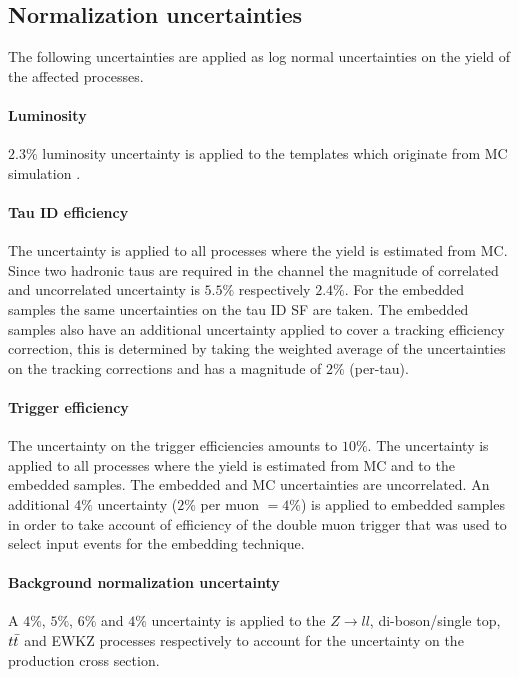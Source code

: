 \subsection{Normalization uncertainties}
The following uncertainties are applied as log normal uncertainties on the yield of the affected
processes.

\paragraph{Luminosity} $2.3 \%$ luminosity uncertainty is applied to the templates which originate from MC simulation \cite{CMS:2018elu}.

\paragraph{Tau ID efficiency} The uncertainty is applied to all processes where the yield is estimated from MC. Since two hadronic taus are required in the \tauh\tauh channel the magnitude of correlated and uncorrelated uncertainty is $5.5\%$ respectively $2.4\%$. For the embedded samples the same uncertainties on the tau ID SF are taken. The embedded samples also have an additional uncertainty applied to cover a tracking efficiency correction, this is determined by taking the weighted average of the uncertainties on the tracking corrections and has a magnitude of $2\%$ (per-tau).

\paragraph{Trigger efficiency} The uncertainty on the trigger efficiencies amounts to $10\%$. The uncertainty is applied to all processes where the yield is estimated from MC and to the embedded samples. The embedded and MC uncertainties are uncorrelated. An additional $4\%$ uncertainty ($2\%$ per muon $= 4\%$) is applied to embedded samples in order to take account of efficiency of the double muon trigger that was used to select input events for the embedding technique.

\paragraph{Background normalization uncertainty} A $4\%$, $5\%$, $6\%$ and $4\%$ uncertainty is applied to the $Z\rightarrow ll$, di-boson/single top, $t\Bar{t}$ and EWKZ processes respectively to account for the uncertainty on the production cross section. 


